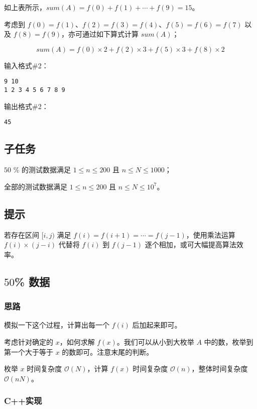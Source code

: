 \documentclass[cn,10pt,math=newtx,citestyle=gb7714-2015,bibstyle=gb7714-2015]{elegantbook}
\begin{document}
如上表所示，$sum(A)=f(0)+f(1)+\cdots + f(9)=15$。

考虑到 $f(0)=f(1)$、$f(2)=f(3)=f(4)$、$f(5)=f(6)=f(7)$ 以及 $f(8)=f(9)$，亦可通过如下算式计算 $sum(A)$；

\begin{equation*}
  sum(A)=f(0)\times 2+f(2)\times 3+f(5)\times 3 + f(8)\times 2
\end{equation*}

输入格式\#2：

\begin{lstlisting}
9 10
1 2 3 4 5 6 7 8 9
\end{lstlisting}

输出格式\#2：

\begin{lstlisting}
45
\end{lstlisting}

\subsection*{子任务}

$50$ \% 的测试数据满足 $1\le n\le 200$ 且 $n\le N\le 1000$；

全部的测试数据满足 $1\le n\le 200$ 且 $n\le N\le 10^7$。

\subsection*{提示}

若存在区间 $[i,j)$ 满足 $f(i)=f(i+1)=\cdots=f(j-1)$，使用乘法运算 $f(i)\times (j-i)$ 代替将 $f(i)$ 到 $f(j-1)$ 逐个相加，或可大幅提高算法效率。

\subsection{$50$\% 数据}

\subsubsection{思路}

模拟一下这个过程，计算出每一个 $f(i)$ 后加起来即可。

考虑针对确定的 $x$，如何求解 $f(x)$。我们可以从小到大枚举 $A$ 中的数，枚举到第一个大于等于 $x$ 的数即可。注意末尾的判断。

枚举 $x$ 时间复杂度 $\mathcal{O}(N)$，计算 $f(x)$ 时间复杂度 $\mathcal{O}(n)$，整体时间复杂度 $\mathcal{O}(nN)$。

\subsubsection{C++实现}
\end{document}
